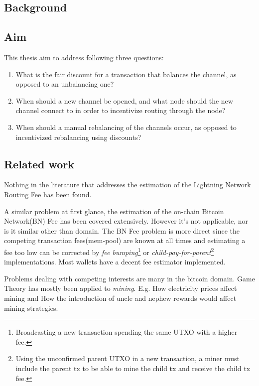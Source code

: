 \subsection{Background}
    \label{sec:background}


\subsection{Aim}
    \label{sec:aim}

This thesis aim to address following three questions:

    \begin{enumerate}
	\item What is the fair discount for a transaction that balances the channel, as
		opposed to an unbalancing one?
	\item When should a new channel be opened, and what node should the new
		channel connect to in order to incentivize routing through the node?
	\item When should a manual rebalancing of the channels occur, as opposed to
		incentivized rebalancing using discounts?
    \end{enumerate}

\subsection{Related work}
    \label{sec:related_work}

	Nothing in the literature that addresses the estimation of the Lightning
	Network Routing Fee has been found. 
	
	A similar problem at first glance, the estimation of the on-chain
	Bitcoin Network(BN) Fee has been covered extensively. However it's not applicable, nor
	is it similar other than domain. The BN Fee problem is more direct since the competing transaction 
	fees(mem-pool) are known at all times and estimating a fee too low can be corrected by \textit{fee bumping}\footnote{Broadcasting a new transaction spending the same UTXO with a higher fee.} or 
	\textit{child-pay-for-parent}\footnote{Using the unconfirmed parent UTXO in a new transaction, a miner must include the parent tx to be able to mine the child tx  and receive the child tx fee.} implementations. Most wallets have a decent fee estimator implemented.
	
	Problems dealing with competing interests are many in the bitcoin domain. Game Theory has mostly been 
	applied to \textit{mining}. E.g. How electricity prices affect mining\cite{singh:dwivedi:strivastava:energy:consumption:mining} and How the introduction of uncle and 
	nephew rewards would affect mining strategies\cite{niu:feng:selfish:mining:ethereum}.
	
	
